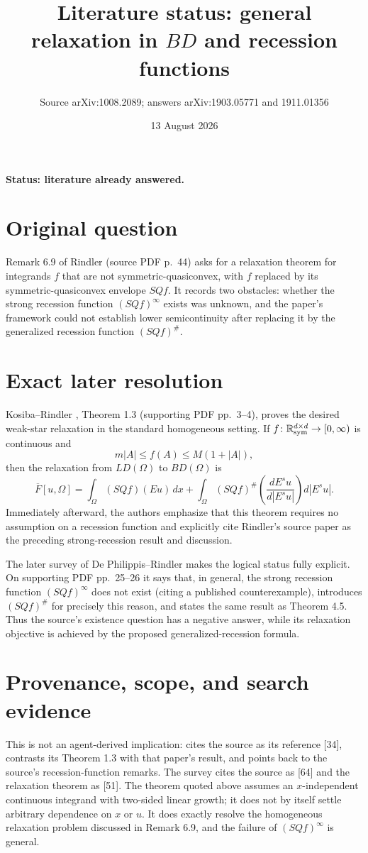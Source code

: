 \documentclass[11pt]{article}
\title{Literature status: general relaxation in $BD$ and recession functions}
\author{Source arXiv:1008.2089; answers arXiv:1903.05771 and 1911.01356}
\date{13 August 2026}
\begin{document}
\maketitle
\noindent\textbf{Status: literature already answered.}

\section*{Original question}
Remark 6.9 of Rindler \cite{Rindler} (source PDF p.~44) asks for a
relaxation theorem for integrands $f$ that are not symmetric-quasiconvex,
with $f$ replaced by its symmetric-quasiconvex envelope $SQf$.  It records
two obstacles: whether the strong recession function $(SQf)^\infty$ exists
was unknown, and the paper's framework could not establish lower
semicontinuity after replacing it by the generalized recession function
$(SQf)^\#$.

\section*{Exact later resolution}
Kosiba--Rindler \cite{KR}, Theorem 1.3 (supporting PDF pp.~3--4), proves the
desired weak-star relaxation in the standard homogeneous setting.  If
$f\colon\mathbb R^{d\times d}_{\rm sym}\to[0,\infty)$ is continuous and
\[
  m|A|\leq f(A)\leq M(1+|A|),
\]
then the relaxation from $LD(\Omega)$ to $BD(\Omega)$ is
\[
 \overline F[u,\Omega]
 =\int_\Omega (SQf)(Eu)\,dx
 +\int_\Omega (SQf)^\#\!\left(\frac{dE^s u}{d|E^s u|}\right)d|E^s u|.
\]
Immediately afterward, the authors emphasize that this theorem requires no
assumption on a recession function and explicitly cite Rindler's source paper
as the preceding strong-recession result and discussion.

The later survey of De Philippis--Rindler \cite{DPR} makes the logical status
fully explicit.  On supporting PDF pp.~25--26 it says that, in general, the
strong recession function $(SQf)^\infty$ does not exist (citing a published
counterexample), introduces $(SQf)^\#$ for precisely this reason, and states
the same result as Theorem 4.5.  Thus the source's existence question has a
negative answer, while its relaxation objective is achieved by the proposed
generalized-recession formula.

\section*{Provenance, scope, and search evidence}
This is not an agent-derived implication: \cite{KR} cites the source as its
reference [34], contrasts its Theorem 1.3 with that paper's result, and points
back to the source's recession-function remarks.  The survey cites the source
as [64] and the relaxation theorem as [51].  The theorem quoted above assumes
an $x$-independent continuous integrand with two-sided linear growth; it does
not by itself settle arbitrary dependence on $x$ or $u$.  It does exactly
resolve the homogeneous relaxation problem discussed in Remark 6.9, and the
failure of $(SQf)^\infty$ is general.
\end{document}
